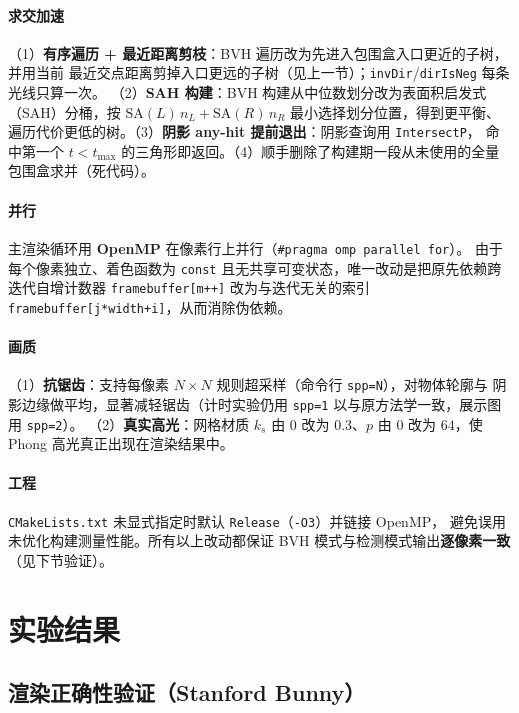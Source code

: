 \documentclass[11pt]{ctexart}
\begin{document}
\paragraph{求交加速}（1）\textbf{有序遍历 + 最近距离剪枝}：BVH 遍历改为先进入包围盒入口更近的子树，并用当前
最近交点距离剪掉入口更远的子树（见上一节）；\texttt{invDir}/\texttt{dirIsNeg} 每条光线只算一次。
（2）\textbf{SAH 构建}：BVH 构建从中位数划分改为表面积启发式（SAH）分桶，按 $\text{SA}(L)\,n_L+\text{SA}(R)\,n_R$
最小选择划分位置，得到更平衡、遍历代价更低的树。（3）\textbf{阴影 any-hit 提前退出}：阴影查询用 \texttt{IntersectP}，
命中第一个 $t<t_{\max}$ 的三角形即返回。（4）顺手删除了构建期一段从未使用的全量包围盒求并（死代码）。

\paragraph{并行}主渲染循环用 \textbf{OpenMP} 在像素行上并行（\texttt{\#pragma omp parallel for}）。
由于每个像素独立、着色函数为 \texttt{const} 且无共享可变状态，唯一改动是把原先依赖跨迭代自增计数器
\texttt{framebuffer[m++]} 改为与迭代无关的索引 \texttt{framebuffer[j*width+i]}，从而消除伪依赖。

\paragraph{画质}（1）\textbf{抗锯齿}：支持每像素 $N\times N$ 规则超采样（命令行 \texttt{spp=N}），对物体轮廓与
阴影边缘做平均，显著减轻锯齿（计时实验仍用 \texttt{spp=1} 以与原方法学一致，展示图用 \texttt{spp=2}）。
（2）\textbf{真实高光}：网格材质 $k_s$ 由 $0$ 改为 $0.3$、$p$ 由 $0$ 改为 $64$，使 Phong 高光真正出现在渲染结果中。

\paragraph{工程}\texttt{CMakeLists.txt} 未显式指定时默认 \texttt{Release}（\texttt{-O3}）并链接 OpenMP，
避免误用未优化构建测量性能。所有以上改动都保证 BVH 模式与检测模式输出\textbf{逐像素一致}（见下节验证）。

\section{实验结果}

\subsection{渲染正确性验证（Stanford Bunny）}
\end{document}
